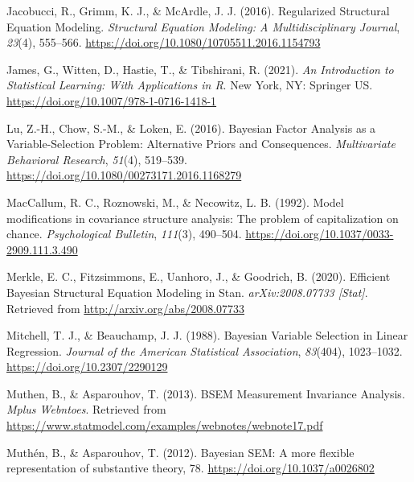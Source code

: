 \documentclass[
  english,
  man, donotrepeattitle,floatsintext]{apa6}
\newlength{\cslhangindent}
\newlength{\cslentryspacingunit} %
\newenvironment{CSLReferences}[2] %
 {%
  \setlength{\parindent}{0pt}
  \ifodd #1
  \let\oldpar\par
  \def\par{\hangindent=\cslhangindent\oldpar}
  \fi
  \setlength{\parskip}{#2\cslentryspacingunit}
 }%
 {}
\begin{document}
\begin{CSLReferences}{1}{0}
\leavevmode{}%
Jacobucci, R., Grimm, K. J., \& McArdle, J. J. (2016). Regularized {Structural} {Equation} {Modeling}. \emph{Structural Equation Modeling: A Multidisciplinary Journal}, \emph{23}(4), 555--566. \url{https://doi.org/10.1080/10705511.2016.1154793}

\leavevmode{}%
James, G., Witten, D., Hastie, T., \& Tibshirani, R. (2021). \emph{An {Introduction} to {Statistical} {Learning}: With {Applications} in {R}}. New York, NY: Springer US. \url{https://doi.org/10.1007/978-1-0716-1418-1}

\leavevmode{}%
Lu, Z.-H., Chow, S.-M., \& Loken, E. (2016). Bayesian {Factor} {Analysis} as a {Variable}-{Selection} {Problem}: {Alternative} {Priors} and {Consequences}. \emph{Multivariate Behavioral Research}, \emph{51}(4), 519--539. \url{https://doi.org/10.1080/00273171.2016.1168279}

\leavevmode{}%
MacCallum, R. C., Roznowski, M., \& Necowitz, L. B. (1992). Model modifications in covariance structure analysis: The problem of capitalization on chance. \emph{Psychological Bulletin}, \emph{111}(3), 490--504. \url{https://doi.org/10.1037/0033-2909.111.3.490}

\leavevmode{}%
Merkle, E. C., Fitzsimmons, E., Uanhoro, J., \& Goodrich, B. (2020). Efficient {Bayesian} {Structural} {Equation} {Modeling} in {Stan}. \emph{arXiv:2008.07733 {[}Stat{]}}. Retrieved from \url{http://arxiv.org/abs/2008.07733}

\leavevmode{}%
Mitchell, T. J., \& Beauchamp, J. J. (1988). Bayesian {Variable} {Selection} in {Linear} {Regression}. \emph{Journal of the American Statistical Association}, \emph{83}(404), 1023--1032. \url{https://doi.org/10.2307/2290129}

\leavevmode{}%
Muthen, B., \& Asparouhov, T. (2013). {BSEM} {Measurement} {Invariance} {Analysis}. \emph{Mplus Webntoes}. Retrieved from \url{https://www.statmodel.com/examples/webnotes/webnote17.pdf}

\leavevmode{}%
Muthén, B., \& Asparouhov, T. (2012). Bayesian {SEM}: {A} more ﬂexible representation of substantive theory, 78. \url{https://doi.org/10.1037/a0026802}


\end{CSLReferences}
\end{document}
